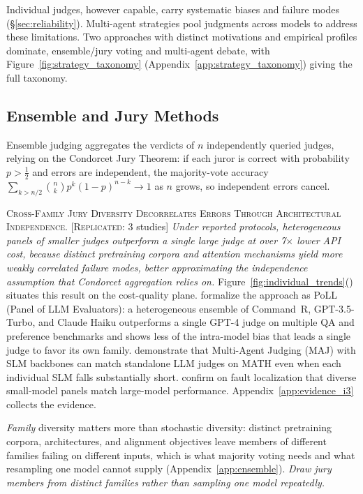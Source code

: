 \documentclass[11pt]{article}
\begin{document}
Individual judges, however capable, carry systematic biases and failure modes (\S\ref{sec:reliability}). Multi-agent strategies pool judgments across models to address these limitations. Two approaches with distinct motivations and empirical profiles dominate, ensemble/jury voting and multi-agent debate, with Figure~\ref{fig:strategy_taxonomy} (Appendix~\ref{app:strategy_taxonomy}) giving the full taxonomy.

\subsection{Ensemble and Jury Methods}

Ensemble judging aggregates the verdicts of $n$ independently queried judges, relying on the Condorcet Jury Theorem: if each juror is correct with probability $p>\tfrac12$ and errors are independent, the majority-vote accuracy $\sum_{k>n/2}\binom{n}{k}p^{k}(1-p)^{n-k}\!\rightarrow 1$ as $n$ grows, so independent errors cancel.

\textsc{Cross-Family Jury Diversity Decorrelates Errors Through Architectural Independence.} [\textsc{Replicated}: 3 studies] \textit{Under reported protocols, heterogeneous panels of smaller judges outperform a single large judge at over 7$\times$ lower API cost, because distinct pretraining corpora and attention mechanisms yield more weakly correlated failure modes, better approximating the independence assumption that Condorcet aggregation relies on.} Figure~\ref{fig:individual_trends}() situates this result on the cost-quality plane. \citet{verga2024replacing} formalize the approach as PoLL (Panel of LLM Evaluators): a heterogeneous ensemble of Command~R, GPT-3.5-Turbo, and Claude Haiku outperforms a single GPT-4 judge on multiple QA and preference benchmarks and shows less of the intra-model bias that leads a single judge to favor its own family. \citet{bi2026judgeboard} demonstrate that Multi-Agent Judging (MAJ) with SLM backbones can match standalone LLM judges on MATH even when each individual SLM falls substantially short. \citet{cho2025cosmosfl} confirm on fault localization that diverse small-model panels match large-model performance. Appendix~\ref{app:evidence_i3} collects the evidence.

\emph{Family} diversity matters more than stochastic diversity: distinct pretraining corpora, architectures, and alignment objectives leave members of different families failing on different inputs, which is what majority voting needs and what resampling one model cannot supply (Appendix~\ref{app:ensemble}). \textit{Draw jury members from distinct families rather than sampling one model repeatedly.}
\end{document}
